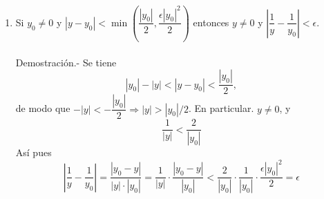 \begin{lema}
\begin{enumerate}[\bfseries (1)]
	    \item Si $y_0 \neq 0$ y $|y-y_0| < \min\left(\dfrac{|y_0|}{2},\dfrac{\epsilon|y_0|^2}{2}\right)$ \; entonces \; $y\neq 0$ y $\left| \dfrac{1}{y} - \dfrac{1}{y_0} \right|< \epsilon$.\\\\
		Demostración.-\; Se tiene $$|y_0|-|y|<|y-y_0|<\dfrac{|y_0|}{2},$$
		de modo que $-|y|< -\dfrac{|y_0|}{2} \Longrightarrow |y|>|y_0|/2$. En particular. $y\neq 0$, y $$\dfrac{1}{|y|}<\dfrac{2}{|y_0|}$$ Así pues 
		$$\left|\dfrac{1}{y}-\dfrac{1}{y_0}\right| = \dfrac{|y_0-y|}{|y|\cdot |y_0|} = \dfrac{1}{|y|}\cdot \dfrac{|y_0-y|}{|y_0|} < \dfrac{2}{|y_0|}\cdot \dfrac{1}{|y_0|} \cdot \dfrac{\epsilon |y_0|^2}{2} = \epsilon$$\\\\
	\end{enumerate}
    \end{lema}
\vspace{1cm}


